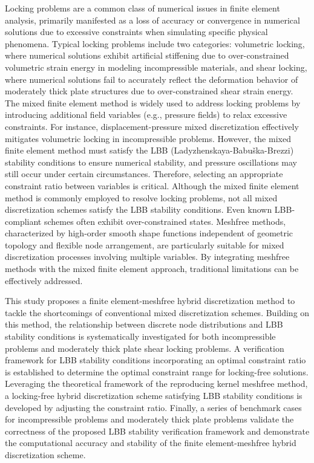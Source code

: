 \begin{abstractEn}
Locking problems are a common class of numerical issues in finite element analysis, primarily manifested as a loss of accuracy or convergence in numerical solutions due to excessive constraints when simulating specific physical phenomena. 
Typical locking problems include two categories: volumetric locking, where numerical solutions exhibit artificial stiffening due to over-constrained volumetric strain energy in modeling incompressible materials, and shear locking, where numerical solutions fail to accurately reflect the deformation behavior of moderately thick plate structures due to over-constrained shear strain energy. 
The mixed finite element method is widely used to address locking problems by introducing additional field variables (e.g., pressure fields) to relax excessive constraints. For instance, displacement-pressure mixed discretization effectively mitigates volumetric locking in incompressible problems. 
However, the mixed finite element method must satisfy the LBB (Ladyzhenskaya-Babuška-Brezzi) stability conditions to ensure numerical stability, and pressure oscillations may still occur under certain circumstances. 
Therefore, selecting an appropriate constraint ratio between variables is critical. Although the mixed finite element method is commonly employed to resolve locking problems, not all mixed discretization schemes satisfy the LBB stability conditions. Even known LBB-compliant schemes often exhibit over-constrained states.
Meshfree methods, characterized by high-order smooth shape functions independent of geometric topology and flexible node arrangement, are particularly suitable for mixed discretization processes involving multiple variables. By integrating meshfree methods with the mixed finite element approach, traditional limitations can be effectively addressed.

This study proposes a finite element-meshfree hybrid discretization method to tackle the shortcomings of conventional mixed discretization schemes. 
Building on this method, the relationship between discrete node distributions and LBB stability conditions is systematically investigated for both incompressible problems and moderately thick plate shear locking problems.
A verification framework for LBB stability conditions incorporating an optimal constraint ratio is established to determine the optimal constraint range for locking-free solutions. 
Leveraging the theoretical framework of the reproducing kernel meshfree method, a locking-free hybrid discretization scheme satisfying LBB stability conditions is developed by adjusting the constraint ratio. 
Finally, a series of benchmark cases for incompressible problems and moderately thick plate problems validate the correctness of the proposed LBB stability verification framework and demonstrate the computational accuracy and stability of the finite element-meshfree hybrid discretization scheme.

\end{abstractEn}

